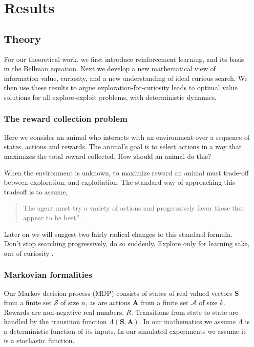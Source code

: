 \section*{Results} 
\subsection*{Theory}
For our theoretical work, we first introduce reinforcement learning, and its basis in the Bellman equation. Next we develop a new mathematical view of information value, curiosity, and a new understanding of ideal curious search. We then use these results to argue exploration-for-curiosity leads to optimal value solutions for all explore-exploit problems, with deterministic dynamics.


\subsubsection*{The reward collection problem}
Here we consider an animal who interacts with an environment over a sequence of states, actions and rewards. The animal's goal is to select actions in a way that maximizes the total reward collected. How should an animal do this? 

When the environment is unknown, to maximize reward an animal must trade-off between exploration, and exploitation. The standard way of approaching this tradeoff is to assume, 

\begin{quote}
The agent must try a variety of actions and progressively favor those that appear to be best'' \cite{Sutton2018}. 
\end{quote}

Later on we will suggest two fairly radical changes to this standard formula. Don’t stop searching progressively, do so suddenly. Explore only for learning sake, out of curiosity \cite{Kidd2015}.


\subsubsection*{Markovian formalities}
Our Markov decision process (MDP) consists of states of real valued vectors $\mathbf{S}$ from a finite set $\mathcal{S}$ of size $n$, as are actions $\mathbf{A}$ from a finite set $\mathcal{A}$ of size $k$. Rewards are non-negative real numbers, $R$. Transitions from state to state are handled by the transition function $\Lambda(\mathbf{S},\mathbf{A})$. In our mathematics we assume $\Lambda$ is a deterministic function of its inputs. In our simulated experiments we assume it is a stochastic function.



